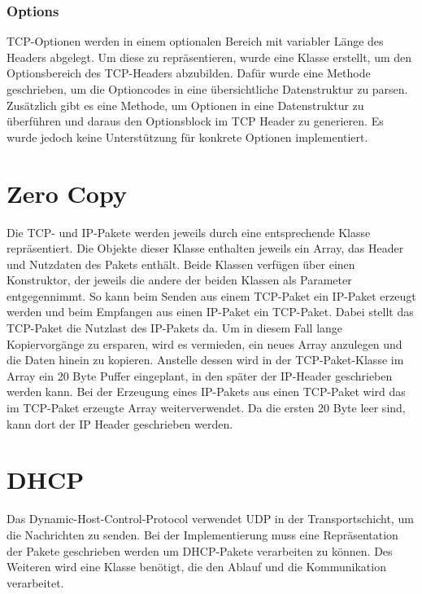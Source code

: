 \subsubsection{Options}
TCP-Optionen werden in einem optionalen Bereich mit variabler Länge des Headers abgelegt. Um diese zu repräsentieren, wurde eine Klasse erstellt, um den Optionsbereich des TCP-Headers abzubilden. Dafür wurde eine Methode geschrieben, um die Optioncodes in eine übersichtliche Datenstruktur zu parsen. Zusätzlich gibt es eine Methode, um Optionen in eine Datenstruktur zu überführen und daraus den Optionsblock im TCP Header zu generieren. Es wurde jedoch keine Unterstützung für konkrete Optionen implementiert.



\section{Zero Copy}
Die TCP- und IP-Pakete werden jeweils durch eine entsprechende Klasse repräsentiert. Die Objekte dieser Klasse enthalten jeweils ein Array, das Header und Nutzdaten des Pakets enthält. Beide Klassen verfügen über einen Konstruktor, der jeweils die andere der beiden Klassen als Parameter entgegennimmt. So kann beim Senden aus einem TCP-Paket ein IP-Paket erzeugt werden und beim Empfangen aus einen IP-Paket ein TCP-Paket. Dabei stellt das TCP-Paket die Nutzlast des IP-Pakets da. Um in diesem Fall lange Kopiervorgänge zu ersparen, wird es vermieden, ein neues Array anzulegen und die Daten hinein zu kopieren. Anstelle dessen wird in der TCP-Paket-Klasse im Array ein 20 Byte Puffer eingeplant, in den später der IP-Header geschrieben werden kann. Bei der Erzeugung eines IP-Pakets aus einen TCP-Paket wird das im TCP-Paket erzeugte Array weiterverwendet. Da die ersten 20 Byte leer sind, kann dort der IP Header geschrieben werden.


\section{DHCP}
Das Dynamic-Host-Control-Protocol verwendet UDP in der Transportschicht, um die Nachrichten zu senden. Bei der Implementierung muss eine Repräsentation der Pakete geschrieben werden um DHCP-Pakete verarbeiten zu können. Des Weiteren wird eine Klasse benötigt, die den Ablauf und die Kommunikation verarbeitet. 

